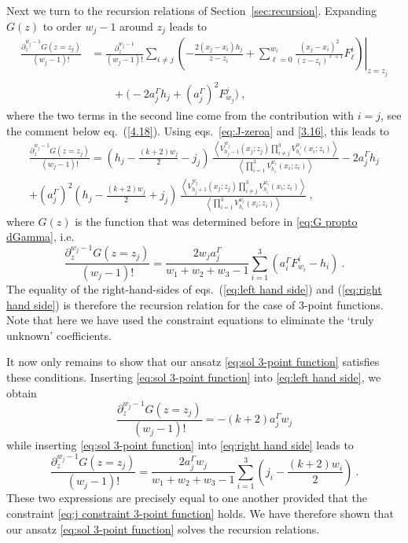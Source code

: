\documentclass[12pt,a4paper]{article}
\newcommand{\be}{\begin{equation}}
\newcommand{\ee}{\end{equation}}
\begin{document}
Next we turn to the recursion relations of Section~\ref{sec:recursion}. Expanding $G(z)$ to order $w_j-1$ around $z_j$ leads to 
\begin{align}
\frac{\partial_z^{w_j-1} G(z=z_j)}{(w_j-1)!}&=\frac{ \partial_{z}^{w_j-1}}{(w_j-1)!}\left.\sum_{i \ne j}\left(-\frac{2(x_j-x_i)h_j}{z-z_i}+\sum_{\ell=0}^{w_i} \frac{(x_j-x_i)^2}{(z-z_i)^{\ell+1}} F_\ell^i\right)\right|_{z=z_j} \nonumber\\
&\qquad +  \bigl( -2a_j^\Gamma h_j+(a_j^\Gamma)^2 F^{j}_{w_j} \bigr) \label{eq:recursion relation derivation 1}\ , 
\end{align}
where the two terms in the second line come from the contribution with $i=j$, see the comment below eq.~(\ref{4.18}). Using eqs.~\eqref{eq:J-zeroa} and \eqref{3.16}, this leads to 
\begin{multline}
\frac{\partial_z^{w_j-1} G(z=z_j)}{(w_j-1)!}
=\left(h_j-\tfrac{(k+2)w_j}{2}-j_j\right) \, \frac{\left\langle V_{h_j-1}^{w_j}(x_j;z_j)\prod_{i\ne j}^3 V_{h_i}^{w_i}(x_i;z_i) \right \rangle}{\left\langle \prod_{i=1}^3 V_{h_i}^{w_i}(x_i;z_i) \right \rangle}-2 a_j^\Gamma h_j\\
+(a_j^\Gamma)^2 \left(h_j-\tfrac{(k+2)w_j}{2}+j_j\right) \, \frac{\left\langle V_{h_j+1}^{w_j}(x_j;z_j)\prod_{i\ne j}^3 V_{h_i}^{w_i}(x_i;z_i) \right \rangle}{\left\langle \prod_{i=1}^3 V_{h_i}^{w_i}(x_i;z_i) \right \rangle}\ , \label{eq:left hand side}
\end{multline}
where $G(z)$ is the function that was determined before in \eqref{eq:G propto dGamma}, i.e.\
\be 
\frac{\partial_z^{w_j-1} G(z=z_j)}{(w_j-1)!}=\frac{2w_j a_j^\Gamma}{w_1+w_2+w_3-1}\sum_{i=1}^3 \left(a_i^\Gamma F_{w_i}^i-h_i\right) \ .\label{eq:right hand side}
\ee
The equality of the right-hand-sides of eqs.~(\ref{eq:left hand side}) and (\ref{eq:right hand side}) is therefore the recursion relation for the case of $3$-point functions. Note that here we have used the constraint equations to eliminate the `truly unknown' coefficients. 
\medskip

It now only remains to show that our ansatz \eqref{eq:sol 3-point function} satisfies these conditions. Inserting \eqref{eq:sol 3-point function} into \eqref{eq:left hand side}, we obtain
\be 
\frac{\partial_z^{w_j-1} G(z=z_j)}{(w_j-1)!}=- (k+2) a_j^\Gamma w_j
\ee
while inserting \eqref{eq:sol 3-point function} into \eqref{eq:right hand side} leads to 
\be 
\frac{\partial_z^{w_j-1} G(z=z_j)}{(w_j-1)!}=\frac{2a_j^\Gamma w_j}{w_1+w_2+w_3-1}\sum_{i=1}^3 \left(j_i-\frac{(k+2) w_i}{2}\right)\ .
\ee
These two expressions are precisely equal to one another provided that the constraint \eqref{eq:j constraint 3-point function} holds. We have therefore shown that our ansatz  \eqref{eq:sol 3-point function} solves the recursion relations. 
\end{document}
